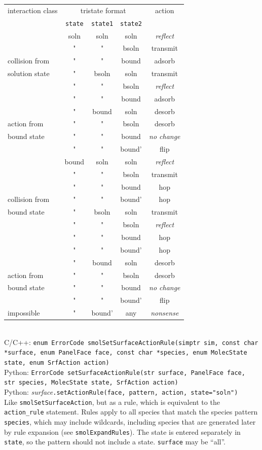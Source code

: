 \documentclass {scrbook}
\newcommand {\ttt} {\texttt}
\begin{document}
\begin{description}
\begin{longtable}[c]{l|ccc|c}
interaction class&\multicolumn{3}{c}{tristate format}&action\\
&\ttt{state}&\ttt{state1}&\ttt{state2}&\\
\hline
&soln&soln&soln&\emph{reflect}\\
&"&"&bsoln&transmit\\
collision from&"&"&bound&adsorb\\
solution state&"&bsoln&soln&transmit\\
&"&"&bsoln&\emph{reflect}\\
&"&"&bound&adsorb\\
\hline
&"&bound&soln&desorb\\
action from&"&"&bsoln&desorb\\
bound state&"&"&bound&\emph{no change}\\
&"&"&bound'&flip\\
\hline
&bound&soln&soln&\emph{reflect}\\
&"&"&bsoln&transmit\\
&"&"&bound&hop\\
collision from&"&"&bound'&hop\\
bound state&"&bsoln&soln&transmit\\
&"&"&bsoln&\emph{reflect}\\
&"&"&bound&hop\\
&"&"&bound'&hop\\
\hline
&"&bound&soln&desorb\\
action from&"&"&bsoln&desorb\\
bound state&"&"&bound&\emph{no change}\\
&"&"&bound'&flip\\
\hline
impossible&"&bound'&any&\emph{nonsense}\\
\end{longtable}

\item[SetSurfaceActionRule]
\hfill \\
C/C++: \ttt{enum ErrorCode smolSetSurfaceActionRule(simptr sim, const char *surface, enum PanelFace face, const char *species, enum MolecState state, enum SrfAction action)}\\
Python: \ttt{ErrorCode setSurfaceActionRule(str surface, PanelFace face, str species, MolecState state, SrfAction action)}\\
Python: \textit{surface}\ttt{.setActionRule(face, pattern, action, state="soln")}\\
Like \ttt{smolSetSurfaceAction}, but as a rule, which is equivalent to the \ttt{action\_rule} statement. Rules apply to all species that match the species pattern \ttt{species}, which may include wildcards, including species that are generated later by rule expansion (see \ttt{smolExpandRules}). The state is entered separately in \ttt{state}, so the pattern should not include a state. \ttt{surface} may be ``all''.


\end{description}
\end{document}
